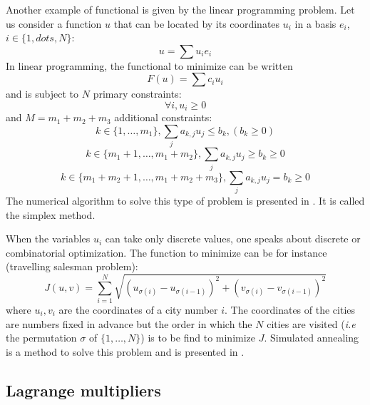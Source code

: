 \documentclass[12pt]{book}
\begin{document}
\begin{exmp}\label{exmplinepro}
Another example of functional is given by the linear programming problem. Let
us consider a function $u$ that can be located by its coordinates
$u_i$ in a basis
$e_i$, $i\in \{1,dots,N\}$:
\begin{equation}
u=\sum u_ie_i
\end{equation}
In linear programming, the functional to minimize can be written  
\begin{equation}
F(u)=\sum c_iu_i
\end{equation}
and is subject to $N$ primary constraints:
\begin{equation}
\forall i, u_i\geq 0
\end{equation}
and $M=m_1+m_2+m_3$ additional constraints:
\begin{equation}
k\in\{1,\dots,m_1\}, \sum_j a_{k,j}u_j\leq b_k, (b_k\geq 0)
\end{equation}
\begin{equation}
k\in\{m_1+1,\dots,m_1+m_2\}, \sum_j a_{k,j}u_j\geq b_k\geq 0
\end{equation}
\begin{equation}
k\in\{m_1+m_2+1,\dots,m_1+m_2+m_3\}, \sum_j a_{k,j}u_j=b_k\geq 0
\end{equation}
The numerical algorithm to solve this type of problem is presented in
\cite{ma:compu:Press92}. It is called the simplex method.
\end{exmp}

\begin{exmp}\label{exmpsimul}
When the variables $u_i$ can take only discrete values, one speaks about
discrete or combinatorial optimization. The function to minimize can be for
instance (travelling salesman problem):
\begin{equation}
J(u,v)=\sum_{i=1}^N \sqrt{(u_{\sigma(i)}-u_{\sigma(i-1)})^2+
  (v_{\sigma(i)}-v_{\sigma(i-1)})^2} 
\end{equation}
where $u_i,v_i$ are the coordinates of a city number $i$. The coordinates of
the cities are numbers fixed in advance but the order in which the $N$ cities
are visited ({\it i.e} the permutation $\sigma$ of $\{1,\dots, N\}$) is to be
find to minimize $J$. Simulated annealing is a method to solve this problem
and is presented in \cite{ma:compu:Press92}. 
\end{exmp}



\subsection{Lagrange multipliers}
\end{document}
